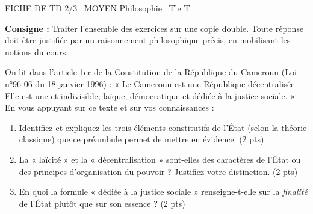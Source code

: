 \documentclass[11pt]{article}
\begin{document}
\begin{tcolorbox}[enhanced,colback=popink,colframe=popink,arc=10pt,boxrule=0pt,left=12pt,right=12pt,top=9pt,bottom=9pt]
{\color{white}\popxbold\small FICHE DE TD 2/3 \textbullet\ MOYEN \hfill Philosophie \textbullet\ Tle T\par}
\end{tcolorbox}
\vspace{4pt}
\noindent\textbf{Consigne :} Traiter l'ensemble des exercices sur une copie double. Toute réponse doit être justifiée par un raisonnement philosophique précis, en mobilisant les notions du cours.

\begin{exercice}
On lit dans l'article 1er de la Constitution de la République du Cameroun (Loi n°96-06 du 18 janvier 1996) : « Le Cameroun est une République décentralisée. Elle est une et indivisible, laïque, démocratique et dédiée à la justice sociale. »\\
En vous appuyant sur ce texte et sur vos connaissances :
\begin{enumerate}
    \item Identifiez et expliquez les trois éléments constitutifs de l'État (selon la théorie classique) que ce préambule permet de mettre en évidence. \hfill (2 pts)
    \item La « laïcité » et la « décentralisation » sont-elles des caractères de l'État ou des principes d'organisation du pouvoir ? Justifiez votre distinction. \hfill (2 pts)
    \item En quoi la formule « dédiée à la justice sociale » renseigne-t-elle sur la \textit{finalité} de l'État plutôt que sur son essence ? \hfill (2 pts)
\end{enumerate}
\end{exercice}
\end{document}
